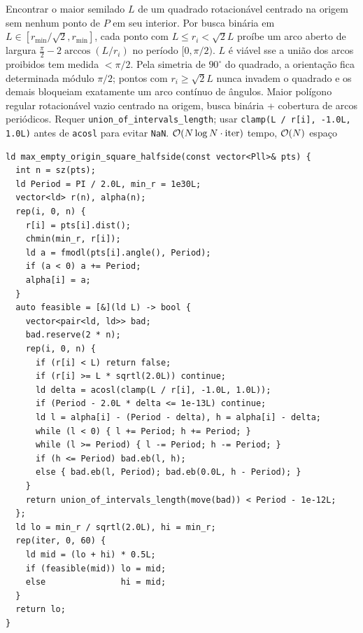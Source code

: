 \algobox
  {Encontrar o maior semilado $L$ de um quadrado rotacionável centrado na origem sem nenhum ponto de $P$ em seu interior.}
  {Por busca binária em $L \in [r_{\min}/\sqrt{2}, r_{\min}]$, cada ponto com $L \le r_i < \sqrt{2} L$ proíbe um arco aberto de largura $\frac{\pi}{2} - 2\arccos(L/r_i)$ no período $[0, \pi/2)$. $L$ é viável sse a união dos arcos proibidos tem medida $< \pi/2$.}
  {Pela simetria de $90^\circ$ do quadrado, a orientação fica determinada módulo $\pi/2$; pontos com $r_i \ge \sqrt{2} L$ nunca invadem o quadrado e os demais bloqueiam exatamente um arco contínuo de ângulos.}
  {Maior polígono regular rotacionável vazio centrado na origem, busca binária + cobertura de arcos periódicos.}
  {Requer \texttt{union\_of\_intervals\_length}; usar \texttt{clamp(L / r[i], -1.0L, 1.0L)} antes de \texttt{acosl} para evitar \texttt{NaN}.}
  {$\mathcal{O}(N \log N \cdot \text{iter})$ tempo, $\mathcal{O}(N)$ espaço}

\begin{lstlisting}
ld max_empty_origin_square_halfside(const vector<Pll>& pts) {
  int n = sz(pts);
  ld Period = PI / 2.0L, min_r = 1e30L;
  vector<ld> r(n), alpha(n);
  rep(i, 0, n) {
    r[i] = pts[i].dist();
    chmin(min_r, r[i]);
    ld a = fmodl(pts[i].angle(), Period);
    if (a < 0) a += Period;
    alpha[i] = a;
  }
  auto feasible = [&](ld L) -> bool {
    vector<pair<ld, ld>> bad;
    bad.reserve(2 * n);
    rep(i, 0, n) {
      if (r[i] < L) return false;
      if (r[i] >= L * sqrtl(2.0L)) continue;
      ld delta = acosl(clamp(L / r[i], -1.0L, 1.0L));
      if (Period - 2.0L * delta <= 1e-13L) continue;
      ld l = alpha[i] - (Period - delta), h = alpha[i] - delta;
      while (l < 0) { l += Period; h += Period; }
      while (l >= Period) { l -= Period; h -= Period; }
      if (h <= Period) bad.eb(l, h);
      else { bad.eb(l, Period); bad.eb(0.0L, h - Period); }
    }
    return union_of_intervals_length(move(bad)) < Period - 1e-12L;
  };
  ld lo = min_r / sqrtl(2.0L), hi = min_r;
  rep(iter, 0, 60) {
    ld mid = (lo + hi) * 0.5L;
    if (feasible(mid)) lo = mid;
    else               hi = mid;
  }
  return lo;
}
\end{lstlisting}

